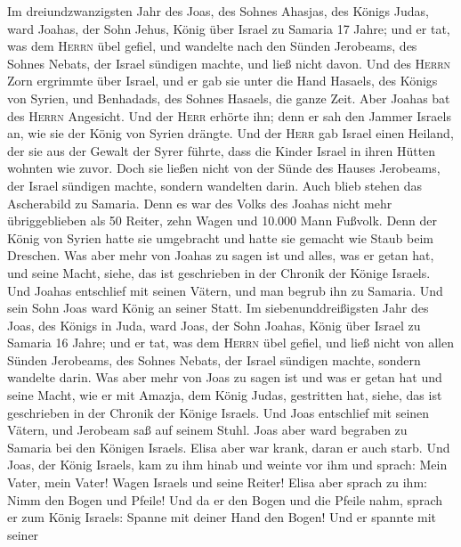  Im dreiundzwanzigsten Jahr des Joas, des Sohnes Ahasjas,
des Königs Judas, ward Joahas, der Sohn Jehus, König über Israel zu
Samaria 17 Jahre;  und er tat, was dem \textsc{Herrn} übel
gefiel, und wandelte nach den Sünden Jerobeams, des Sohnes Nebats, der
Israel sündigen machte, und ließ nicht davon.  Und des
\textsc{Herrn} Zorn ergrimmte über Israel, und er gab sie unter die Hand
Hasaels, des Königs von Syrien, und Benhadads, des Sohnes Hasaels, die
ganze Zeit.  Aber Joahas bat des \textsc{Herrn} Angesicht.
Und der \textsc{Herr} erhörte ihn; denn er sah den Jammer Israels an,
wie sie der König von Syrien drängte.  Und der
\textsc{Herr} gab Israel einen Heiland, der sie aus der Gewalt der Syrer
führte, dass die Kinder Israel in ihren Hütten wohnten wie zuvor.
 Doch sie ließen nicht von der Sünde des Hauses Jerobeams,
der Israel sündigen machte, sondern wandelten darin. Auch blieb stehen
das Ascherabild zu Samaria.  Denn es war des Volks des
Joahas nicht mehr übriggeblieben als 50 Reiter, zehn Wagen und 10.000
Mann Fußvolk. Denn der König von Syrien hatte sie umgebracht und hatte
sie gemacht wie Staub beim Dreschen.  Was aber mehr von
Joahas zu sagen ist und alles, was er getan hat, und seine Macht, siehe,
das ist geschrieben in der Chronik der Könige Israels. 
Und Joahas entschlief mit seinen Vätern, und man begrub ihn zu Samaria.
Und sein Sohn Joas ward König an seiner Statt.  Im
siebenunddreißigsten Jahr des Joas, des Königs in Juda, ward Joas, der
Sohn Joahas, König über Israel zu Samaria 16 Jahre;  und
er tat, was dem \textsc{Herrn} übel gefiel, und ließ nicht von allen
Sünden Jerobeams, des Sohnes Nebats, der Israel sündigen machte, sondern
wandelte darin.  Was aber mehr von Joas zu sagen ist und
was er getan hat und seine Macht, wie er mit Amazja, dem König Judas,
gestritten hat, siehe, das ist geschrieben in der Chronik der Könige
Israels.  Und Joas entschlief mit seinen Vätern, und
Jerobeam saß auf seinem Stuhl. Joas aber ward begraben zu Samaria bei
den Königen Israels.  Elisa aber war krank, daran er auch
starb. Und Joas, der König Israels, kam zu ihm hinab und weinte vor ihm
und sprach: Mein Vater, mein Vater! Wagen Israels und seine Reiter!
 Elisa aber sprach zu ihm: Nimm den Bogen und Pfeile! Und
da er den Bogen und die Pfeile nahm,  sprach er zum König
Israels: Spanne mit deiner Hand den Bogen! Und er spannte mit seiner
